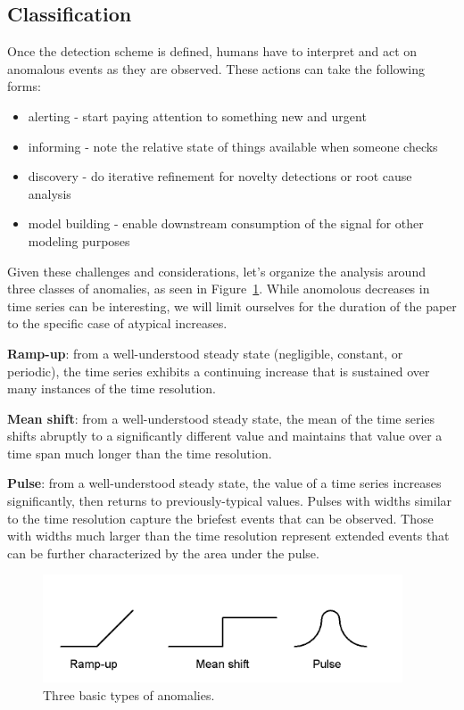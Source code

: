 \documentclass{article}
\begin{document}
\subsection{Classification}
Once the detection scheme is defined, humans have to interpret
and act on anomalous events as they are observed. These actions can take the
following forms:

\begin{itemize} 
    \item alerting - start paying attention to something new and urgent 
    \item informing - note the relative state of things available when someone 
        checks 
    \item discovery - do iterative refinement for novelty detections or root 
        cause analysis 
    \item model building - enable downstream consumption of the signal for 
        other modeling purposes 
\end{itemize}

Given these challenges and considerations, let’s organize the analysis around
three classes of anomalies, as seen in Figure~\ref{fig:anomalies}. While
anomolous decreases in time series can be interesting, we will limit ourselves
for the duration of the paper to the specific case of atypical increases.

\textbf{Ramp-up}: from a well-understood steady state (negligible, constant, or
periodic), the time series exhibits a continuing increase that is sustained
over many instances of the time resolution. 

\textbf{Mean shift}: from a well-understood steady state, the mean of the time
series shifts abruptly to a significantly different value and maintains that
value over a time span much longer than the time resolution. 

\textbf{Pulse}: from a well-understood steady state, the value of a time series
increases significantly, then returns to previously-typical values.
Pulses with widths similar to the time resolution capture the briefest
events that can be observed. Those with widths much larger than 
the time resolution represent extended events that can be further
characterized by the area under the pulse.

\begin{figure}[ht]
\begin{center}
\includegraphics[width=0.95\textwidth]{fig/anomalies.png}
\caption{Three basic types of anomalies.}
\label{fig:anomalies}
\end{center}
\end{figure}
\end{document}
